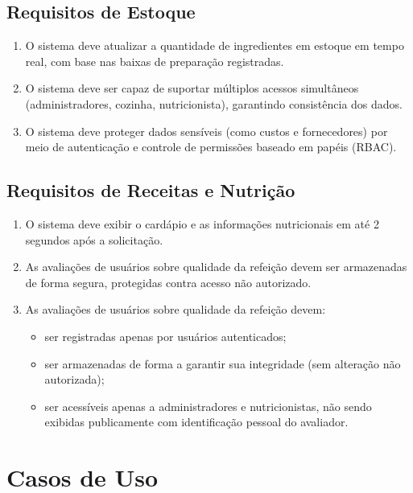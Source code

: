 \documentclass[12pt,a4paper]{article}
\begin{document}
\subsection{Requisitos de Estoque}
\begin{enumerate}[label=\textbf{RNF-EST-\arabic*}, leftmargin=*, align=left]
    \item O sistema deve atualizar a quantidade de ingredientes em estoque em tempo real, com base nas baixas de preparação registradas.
    \item O sistema deve ser capaz de suportar múltiplos acessos simultâneos (administradores, cozinha, nutricionista), garantindo consistência dos dados.
    \item O sistema deve proteger dados sensíveis (como custos e fornecedores) por meio de autenticação e controle de permissões baseado em papéis (RBAC).
\end{enumerate}

\subsection{Requisitos de Receitas e Nutrição}
\begin{enumerate}[label=\textbf{RNF-NUT-\arabic*}, leftmargin=*, align=left]
    \item O sistema deve exibir o cardápio e as informações nutricionais em até 2 segundos após a solicitação.
    \item As avaliações de usuários sobre qualidade da refeição devem ser armazenadas de forma segura, protegidas contra acesso não autorizado.
\item As avaliações de usuários sobre qualidade da refeição devem:
\begin{itemize}
    \item ser registradas apenas por usuários autenticados;
    \item ser armazenadas de forma a garantir sua integridade (sem alteração não autorizada);
    \item ser acessíveis apenas a administradores e nutricionistas, não sendo exibidas publicamente com identificação pessoal do avaliador.
\end{itemize}

\end{enumerate}


\section{Casos de Uso}
\end{document}
